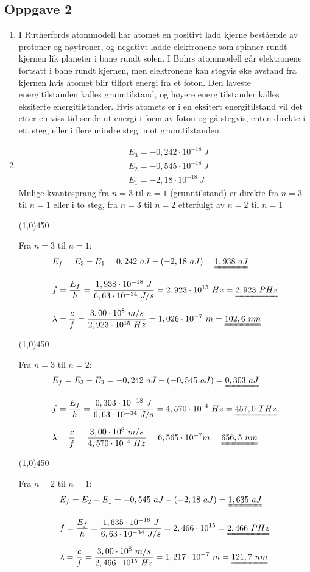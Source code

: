 \documentclass[11pt,a4paper]{report}
\newcommand{\opgd}[1]{\item[#1)]}
\newcommand{\opg}[1]{\subsection*{Oppgave #1}}
\begin{document}
\newpage
\opg{2}
\begin{enumerate}[leftmargin=*,itemsep=1cm,labelsep=2em,label=\alph*)]
\opgd{a}
I Rutherfords atommodell har atomet en positivt ladd kjerne bestående av protoner og nøytroner, og negativt ladde elektronene som spinner rundt kjernen lik planeter i bane rundt solen. I Bohrs atommodell går elektronene fortsatt i bane rundt kjernen, men elektronene kan stegvis øke avstand fra kjernen hvis atomet blir tilført energi fra et foton. Den laveste energitilstanden kalles grunntilstand, og høyere energitilstander kalles eksiterte energitilstander. Hvis atomets er i en eksitert energitilstand vil det etter en viss tid sende ut energi i form av foton og gå stegvis, enten direkte i ett steg, eller i flere mindre steg, mot grunntilstanden.
\opgd{b}
\begin{align*}
&E_3 = -0,242 \cdot 10^{-18}\ J\\
&E_2 = -0,545 \cdot 10^{-18}\ J\\
&E_1 = -2,18 \cdot 10^{-18}\ J
\end{align*}
Mulige kvantesprang fra $n=3$ til $n=1$ (grunntilstand) er direkte fra $n=3$ til $n=1$ eller i to steg, fra $n=3$ til $n=2$ etterfulgt av $n=2$ til $n=1$
\begin{center}
\line(1,0){450}
\end{center}
Fra $n=3$ til $n=1$:
\begin{align*}
&E_f = E_3 - E_1 = 0,242\ aJ - (-2,18\ aJ) = \uuline{1,938\ aJ}\\[0.2cm]
&f = \frac{E_f}{h} = \frac{1,938 \cdot 10^{-18}\ J}{6,63 \cdot 10^{-34}\ J/s} = 2,923 \cdot 10^{15}\ Hz = \uuline{2,923\ PHz}\\[0.2cm]
&\lambda = \frac{c}{f} = \frac{3,00 \cdot 10^8\ m/s}{2,923 \cdot 10^{15}\ Hz} = 1,026 \cdot 10^{-7}\ m = \uuline{102,6\ nm}
\end{align*}
\begin{center}
\line(1,0){450}
\end{center}
Fra $n=3$ til $n=2$:
\begin{align*}
&E_f = E_3 - E_2 = -0,242\ aJ - (-0,545\ aJ) = \uuline{0,303\ aJ}\\[0.2cm]
&f = \frac{E_f}{h} = \frac{0,303 \cdot 10^{-18}\ J}{6,63 \cdot 10^{-34}\ J/s} = 4,570 \cdot 10^{14}\ Hz = \uuline{457,0\ THz}\\[0.2cm]
&\lambda = \frac{c}{f} = \frac{3,00 \cdot 10^8\ m/s}{4,570 \cdot 10^{14}\ Hz} = 6,565 \cdot 10^{-7} m = \uuline{656,5\ nm}
\end{align*}
\begin{center}
\line(1,0){450}
\end{center}
Fra $n=2$ til $n=1$:
\begin{align*}
&E_f = E_2 - E_1 = -0,545\ aJ - (-2,18\ aJ) = \uuline{1,635\ aJ}\\[0.2cm]
&f = \frac{E_f}{h} = \frac{1,635 \cdot 10^{-18}\ J}{6,63 \cdot 10^{-34}\ J/s} = 2,466 \cdot 10^{15} = \uuline{2,466\ PHz}\\[0.2cm]
&\lambda = \frac{c}{f} = \frac{3,00 \cdot 10^8\ m/s}{2,466 \cdot 10^{15}\ Hz} = 1,217 \cdot 10^{-7}\ m = \uuline{121,7\ nm}
\end{align*}
\end{enumerate}
\end{document}
